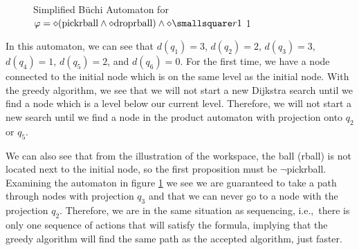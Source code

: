 \begin{figure}
\centering
{}
\caption{Simplified B\"uchi Automaton for $\varphi = \diamond (\text{pickrball} \wedge \diamond \text{droprball}) \wedge \diamond \smallsquare r1$ 1}
\label{fig:ex1SimplifiedBuchi}
\end{figure} 

In this automaton, we can see that $d(q_1)=3$, $d(q_2)=2$, $d(q_3)=3$, $d(q_4)=1$, $d(q_5)=2$, and $d(q_6)=0$. For the first time, we have a node connected to the initial node which is on the same level as the initial node. With the greedy algorithm, we see that we will not start a new Dijkstra search until we find a node which is a level below our current level. Therefore, we will not start a new search until we find a node in the product automaton with projection onto $q_2$ or $q_5$. 

We can also see that from the illustration of the workspace, the ball (rball) is not located next to the initial node, so the first proposition must be $\neg$pickrball. Examining the automaton in figure \ref{fig:ex1SimplifiedBuchi} we see we are guaranteed to take a path through nodes with projection $q_3$ and that we can never go to a node with the projection $q_2$. Therefore, we are in the same situation as sequencing, i.e.,\ there is only one sequence of actions that will satisfy the formula, implying that the greedy algorithm will find the same path as the accepted algorithm, just faster. 

